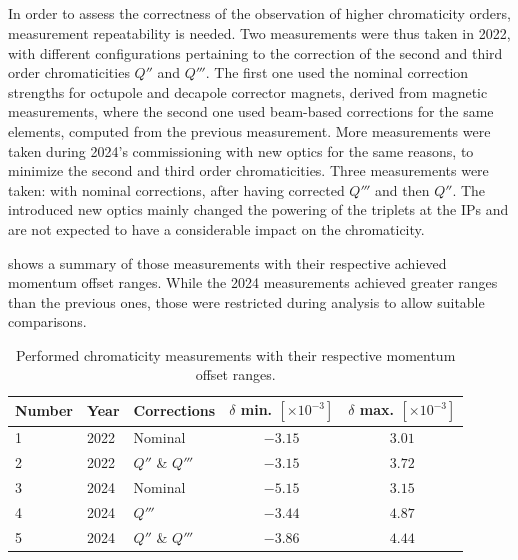 \subsection{}

In order to assess the correctness of the observation of higher chromaticity orders, measurement
repeatability is needed. Two measurements were thus taken in 2022, with different configurations
pertaining to the correction of the second and third order chromaticities $Q''$ and $Q'''$. 
The first one used the nominal correction strengths for octupole and decapole corrector magnets,
derived from magnetic measurements, where the second one used beam-based corrections for the same
elements, computed from the previous measurement.
More measurements were taken during 2024's commissioning with new optics for the same reasons, to
minimize the second and third order chromaticities. Three measurements were taken: with nominal
corrections, after having corrected $Q'''$  and then $Q''$. The introduced new optics mainly changed
the powering of the triplets at the IPs and are not expected to have a considerable impact on the
chromaticity. 

 shows a summary of those measurements with their respective 
achieved momentum offset ranges. While the 2024 measurements achieved greater ranges than the
previous ones, those were restricted during analysis to allow suitable comparisons.

\begin{table}[!htb]
  \centering
  \begin{tabular}{lllcc}
    \toprule
    Number & Year & Corrections      & $\delta$ min. $[\times 10^{-3}]$ & $\delta$ max. $[\times 10^{-3}]$  \\
    \midrule
    1 & 2022 & Nominal          & $-3.15$ & $3.01$  \\
    2 & 2022 & $Q''$ \& $Q'''$  & $-3.15$ & $3.72$  \\
    3 & 2024 & Nominal          & $-5.15$ & $3.15$  \\
    4 & 2024 & $Q'''$           & $-3.44$ & $4.87$  \\
    5 & 2024 & $Q''$ \& $Q'''$  & $-3.86$ & $4.44$  \\
    \bottomrule
  \end{tabular}
  \caption{Performed chromaticity measurements with their respective momentum offset ranges.}
  \label{table:high_orders:dpp_ranges}
\end{table}

